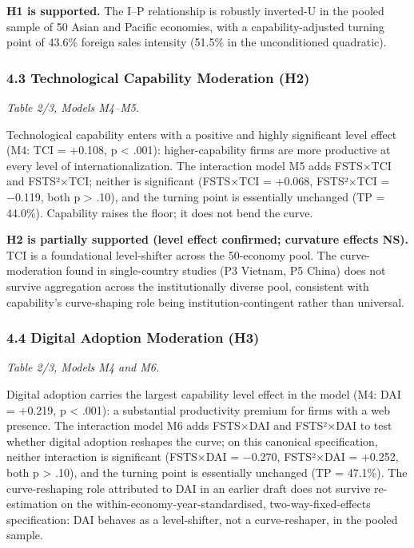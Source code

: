 \documentclass[
  12pt,a4paper]{article}
\begin{document}
\textbf{H1 is supported.} The I--P relationship is robustly inverted-U
in the pooled sample of 50 Asian and Pacific economies, with a
capability-adjusted turning point of 43.6\% foreign sales intensity
(51.5\% in the unconditioned quadratic).

\hypertarget{technological-capability-moderation-h2}{%
\subsubsection{4.3 Technological Capability Moderation
(H2)}\label{technological-capability-moderation-h2}}

\emph{Table 2/3, Models M4--M5.}

Technological capability enters with a positive and highly significant
level effect (M4: TCI = +0.108, p \textless{} .001): higher-capability
firms are more productive at every level of internationalization. The
interaction model M5 adds FSTS×TCI and FSTS²×TCI; neither is significant
(FSTS×TCI = +0.068, FSTS²×TCI = −0.119, both p \textgreater{} .10), and
the turning point is essentially unchanged (TP = 44.0\%). Capability
raises the floor; it does not bend the curve.

\textbf{H2 is partially supported (level effect confirmed; curvature
effects NS).} TCI is a foundational level-shifter across the 50-economy
pool. The curve-moderation found in single-country studies (P3 Vietnam,
P5 China) does not survive aggregation across the institutionally
diverse pool, consistent with capability's curve-shaping role being
institution-contingent rather than universal.

\hypertarget{digital-adoption-moderation-h3}{%
\subsubsection{4.4 Digital Adoption Moderation
(H3)}\label{digital-adoption-moderation-h3}}

\emph{Table 2/3, Models M4 and M6.}

Digital adoption carries the largest capability level effect in the
model (M4: DAI = +0.219, p \textless{} .001): a substantial productivity
premium for firms with a web presence. The interaction model M6 adds
FSTS×DAI and FSTS²×DAI to test whether digital adoption reshapes the
curve; on this canonical specification, neither interaction is
significant (FSTS×DAI = −0.270, FSTS²×DAI = +0.252, both p
\textgreater{} .10), and the turning point is essentially unchanged (TP
= 47.1\%). The curve-reshaping role attributed to DAI in an earlier
draft does not survive re-estimation on the
within-economy-year-standardised, two-way-fixed-effects specification:
DAI behaves as a level-shifter, not a curve-reshaper, in the pooled
sample.
\end{document}
